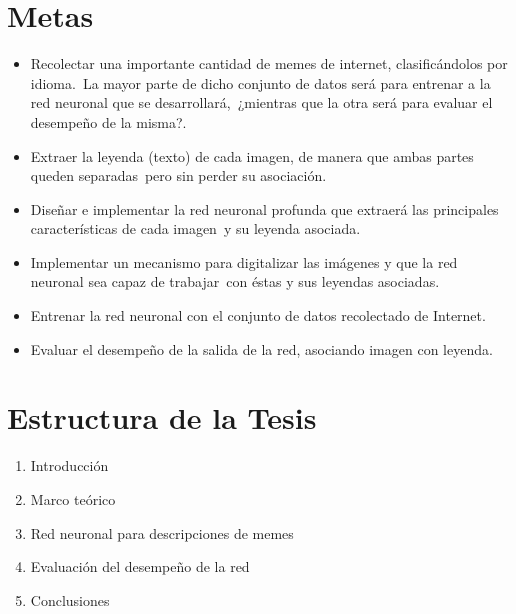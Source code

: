 \documentclass[paper=letter, fontsize=10pt]{scrartcl}
\begin{document}
\section*{Metas}

\begin{itemize}
\item Recolectar una importante cantidad de memes de internet, clasificándolos por idioma.\
  La mayor parte de dicho conjunto de datos será para entrenar a la red neuronal que se desarrollará,\
  ¿mientras que la otra será para evaluar el desempeño de la misma?.
\item Extraer la leyenda (texto) de cada imagen, de manera que ambas partes queden separadas\
  pero sin perder su asociación.
\item Diseñar e implementar la red neuronal profunda que extraerá las principales características de cada imagen\
  y su leyenda asociada.
\item Implementar un mecanismo para digitalizar las imágenes y que la red neuronal sea capaz de trabajar\
  con éstas y sus leyendas asociadas.
\item Entrenar la red neuronal con el conjunto de datos recolectado de Internet.
\item Evaluar el desempeño de la salida de la red, asociando imagen con leyenda.
\end{itemize}

\section*{Estructura de la Tesis}

\begin{enumerate}
\item Introducción
\item Marco teórico
\item Red neuronal para descripciones de memes
\item Evaluación del desempeño de la red
\item Conclusiones
\end{enumerate}

\nocite{*}
\printbibliography[title={Propuesta de bibliografía}]

\end{document}
